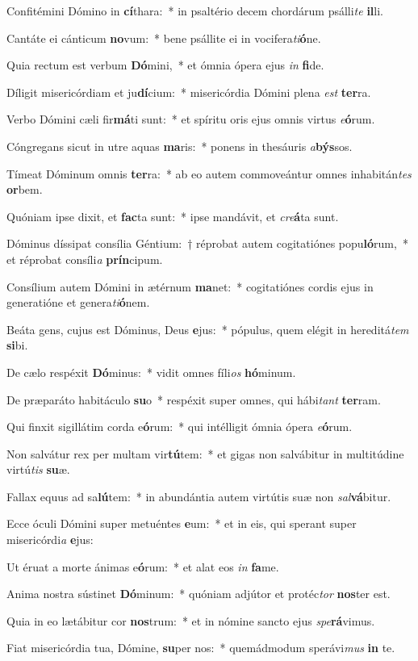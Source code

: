 \item Confitémini Dómino in \textbf{cí}thara:~* in psaltério decem chordárum psálli\textit{te} \textbf{il}li.
\item Cantáte ei cánticum \textbf{no}vum:~* bene psállite ei in vocifera\textit{ti}\textbf{ó}ne.
\item Quia rectum est verbum \textbf{Dó}mini,~* et ómnia ópera ejus \textit{in} \textbf{fi}de.
\item Díligit misericórdiam et ju\textbf{dí}cium:~* misericórdia Dómini plena \textit{est} \textbf{ter}ra.
\item Verbo Dómini cæli fir\textbf{má}ti sunt:~* et spíritu oris ejus omnis virtus \textit{e}\textbf{ó}rum.
\item Cóngregans sicut in utre aquas \textbf{ma}ris:~* ponens in thesáuris \textit{a}\textbf{býs}sos.
\item Tímeat Dóminum omnis \textbf{ter}ra:~* ab eo autem commoveántur omnes inhabitán\textit{tes} \textbf{or}bem.
\item Quóniam ipse dixit, et \textbf{fac}ta sunt:~* ipse mandávit, et \textit{cre}\textbf{á}ta sunt.
\item Dóminus díssipat consília Géntium:~† réprobat autem cogitatiónes popu\textbf{ló}rum,~* et réprobat consíli\textit{a} \textbf{prín}cipum.
\item Consílium autem Dómini in ætérnum \textbf{ma}net:~* cogitatiónes cordis ejus in generatióne et genera\textit{ti}\textbf{ó}nem.
\item Beáta gens, cujus est Dóminus, Deus \textbf{e}jus:~* pópulus, quem elégit in hereditá\textit{tem} \textbf{si}bi.
\item De cælo respéxit \textbf{Dó}minus:~* vidit omnes fíli\textit{os} \textbf{hó}minum.
\item De præparáto habitáculo \textbf{su}o~* respéxit super omnes, qui hábi\textit{tant} \textbf{ter}ram.
\item Qui finxit sigillátim corda e\textbf{ó}rum:~* qui intélligit ómnia ópera \textit{e}\textbf{ó}rum.
\item Non salvátur rex per multam vir\textbf{tú}tem:~* et gigas non salvábitur in multitúdine virtú\textit{tis} \textbf{su}æ.
\item Fallax equus ad sa\textbf{lú}tem:~* in abundántia autem virtútis suæ non \textit{sal}\textbf{vá}bitur.
\item Ecce óculi Dómini super metuéntes \textbf{e}um:~* et in eis, qui sperant super misericórdi\textit{a} \textbf{e}jus:
\item Ut éruat a morte ánimas e\textbf{ó}rum:~* et alat eos \textit{in} \textbf{fa}me.
\item Anima nostra sústinet \textbf{Dó}minum:~* quóniam adjútor et protéc\textit{tor} \textbf{nos}ter est.
\item Quia in eo lætábitur cor \textbf{nos}trum:~* et in nómine sancto ejus \textit{spe}\textbf{rá}vimus.
\item Fiat misericórdia tua, Dómine, \textbf{su}per nos:~* quemádmodum sperávi\textit{mus} \textbf{in} te.
